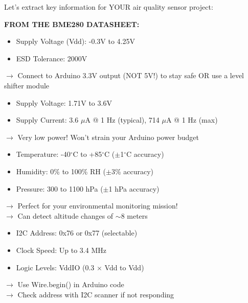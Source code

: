 \documentclass[11pt,letterpaper]{article}
\begin{document}
Let's extract key information for YOUR air quality sensor project:

\textbf{FROM THE BME280 DATASHEET:}

\begin{tcolorbox}[title=ABSOLUTE MAXIMUM RATINGS]
\begin{itemize}[nosep]
\item Supply Voltage (Vdd): -0.3V to 4.25V
\item ESD Tolerance: 2000V
\end{itemize}
$\rightarrow$ Connect to Arduino 3.3V output (NOT 5V!) to stay safe OR use a level shifter module
\end{tcolorbox}

\begin{tcolorbox}[title=OPERATING CONDITIONS]
\begin{itemize}[nosep]
\item Supply Voltage: 1.71V to 3.6V
\item Supply Current: 3.6 $\mu$A @ 1 Hz (typical), 714 $\mu$A @ 1 Hz (max)
\end{itemize}
$\rightarrow$ Very low power! Won't strain your Arduino power budget
\end{tcolorbox}

\begin{tcolorbox}[title=MEASUREMENT RANGES \& ACCURACY]
\begin{itemize}[nosep]
\item Temperature: -40$^\circ$C to +85$^\circ$C ($\pm$1$^\circ$C accuracy)
\item Humidity: 0\% to 100\% RH ($\pm$3\% accuracy)
\item Pressure: 300 to 1100 hPa ($\pm$1 hPa accuracy)
\end{itemize}
$\rightarrow$ Perfect for your environmental monitoring mission!\\
$\rightarrow$ Can detect altitude changes of $\sim$8 meters
\end{tcolorbox}

\begin{tcolorbox}[title=I2C INTERFACE]
\begin{itemize}[nosep]
\item I2C Address: 0x76 or 0x77 (selectable)
\item Clock Speed: Up to 3.4 MHz
\item Logic Levels: VddIO (0.3 $\times$ Vdd to Vdd)
\end{itemize}
$\rightarrow$ Use Wire.begin() in Arduino code\\
$\rightarrow$ Check address with I2C scanner if not responding
\end{tcolorbox}
\end{document}
